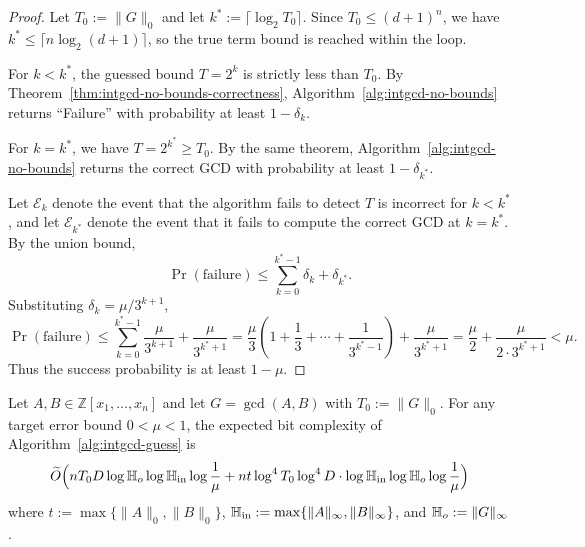 \documentclass{article}
\numberwithin{equation}{section}
\begin{document}
\begin{proof}
Let $T_0 := \|G\|_0$ and let $k^* := \lceil \log_2 T_0 \rceil$. 
Since $T_0 \le (d+1)^n$, we have $k^* \le \lceil n\log_2(d+1) \rceil$, so the true term bound is reached within the loop.

For $k < k^*$, the guessed bound $T = 2^k$ is strictly less than $T_0$. 
By Theorem~\ref{thm:intgcd-no-bounds-correctness}, Algorithm~\ref{alg:intgcd-no-bounds} returns ``Failure'' with probability at least $1 - \delta_k$.

For $k = k^*$, we have $T = 2^{k^*} \ge T_0$. 
By the same theorem, Algorithm~\ref{alg:intgcd-no-bounds} returns the correct GCD with probability at least $1 - \delta_{k^*}$.

Let $\mathcal{E}_k$ denote the event that the algorithm fails to detect $T$ is incorrect for $k < k^*$, and let $\mathcal{E}_{k^*}$ denote the event that it fails to compute the correct GCD at $k = k^*$. 
By the union bound,
\[
\Pr(\text{failure}) \le \sum_{k=0}^{k^*-1} \delta_k + \delta_{k^*}.
\]
Substituting $\delta_k = \mu / 3^{k+1}$,
\[
\Pr(\text{failure})
\le \sum_{k=0}^{k^*-1} \frac{\mu}{3^{k+1}} + \frac{\mu}{3^{k^*+1}}
= \frac{\mu}{3}\left(1 + \frac{1}{3} + \cdots + \frac{1}{3^{k^*-1}}\right) + \frac{\mu}{3^{k^*+1}}
= \frac{\mu}{2} + \frac{\mu}{2 \cdot 3^{k^*+1}}
< \mu.
\]
Thus the success probability is at least $1-\mu$.
\end{proof}

\begin{theorem}
Let $A, B \in \mathbb{Z}[x_1,\dots,x_n]$ and let $G = \gcd(A,B)$ with $T_0 := \|G\|_0$. 
For any target error bound $0 < \mu < 1$, the expected bit complexity of Algorithm~\ref{alg:intgcd-guess} is
\[ \widetilde{O}\Bigl( 
nT_0 D\log\mathbb{H}_{o}\log\mathbb{H}_{\rm in}\log\frac{1}{\mu}
+ n t \log^4 T_0\log^4 D \cdot \log \mathbb{H}_{\rm in} \log\mathbb{H}_{o}\log\frac{1}{\mu}
\Bigr)
\]
where $t := \max\{\|A\|_0,\|B\|_0\}$, $\mathbb{H}_{\rm in} := \max\{\|A\|_\infty,\|B\|_\infty\}$, and $\mathbb{H}_{o} := \|G\|_\infty$.
\end{theorem}
\end{document}
